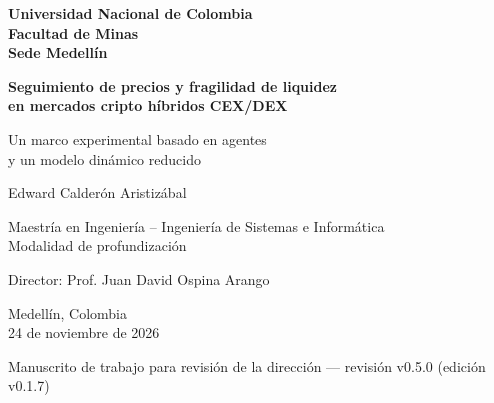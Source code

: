 \documentclass[11pt,letterpaper]{report}
\newcommand{\versionTesis}{v0.1.7}
\newcommand{\revisionManuscrito}{v0.5.0}
\numberwithin{equation}{chapter}
\begin{document}
\begin{titlepage}
  \thispagestyle{empty}
  \centering
  \singlespacing
  {\large\bfseries Universidad Nacional de Colombia\\[2pt]
  Facultad de Minas\\[2pt]
  Sede Medellín\par}
  \vspace{3.2cm}
  {\LARGE\bfseries Seguimiento de precios y fragilidad de liquidez\\
  en mercados cripto híbridos CEX/DEX\par}
  \vspace{0.9cm}
  {\Large Un marco experimental basado en agentes\\
  y un modelo dinámico reducido\par}
  \vspace{2.6cm}
  {\Large Edward Calderón Aristizábal\par}
  \vspace{1.6cm}
  {\large Maestría en Ingeniería -- Ingeniería de Sistemas e Informática\\[2pt]
  Modalidad de profundización\par}
  \vspace{0.8cm}
  {\large Director: Prof. Juan David Ospina Arango\par}
  \vfill
  {\large Medellín, Colombia\\[2pt]
  24 de noviembre de 2026\par}
  \vspace{0.3cm}
  {\small Manuscrito de trabajo para revisión de la dirección --- revisión \revisionManuscrito{} (edición \versionTesis{})\par}
\end{titlepage}

\setcounter{page}{1}

\begingroup
\setcounter{secnumdepth}{-1}
\titleformat{\section}{\Large\bfseries}{}{0pt}{}
\singlespacing

\clearpage

\endgroup
\setcounter{secnumdepth}{2}
\end{document}
